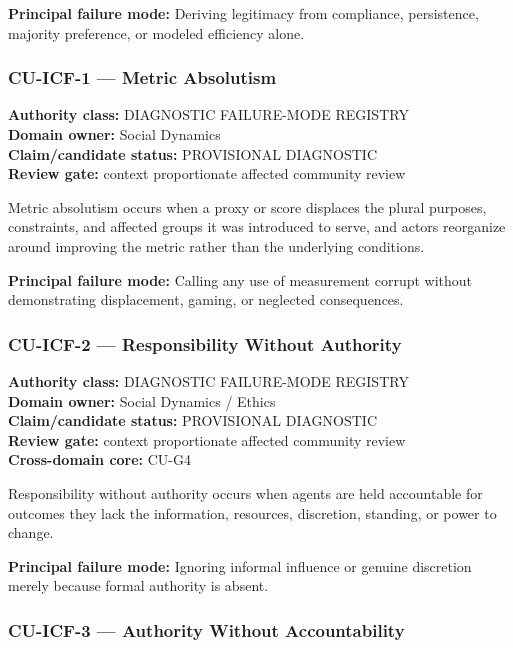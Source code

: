 \documentclass[
  11pt,
]{article}
\begin{document}
\textbf{Principal failure mode:} Deriving legitimacy from compliance,
persistence, majority preference, or modeled efficiency alone.

\subsubsection{CU-ICF-1 --- Metric
Absolutism}\label{cu-icf-1-metric-absolutism}

\textbf{Authority class:} DIAGNOSTIC FAILURE-MODE REGISTRY\\
\textbf{Domain owner:} Social Dynamics\\
\textbf{Claim/candidate status:} PROVISIONAL DIAGNOSTIC\\
\textbf{Review gate:} context proportionate affected community review

Metric absolutism occurs when a proxy or score displaces the plural
purposes, constraints, and affected groups it was introduced to serve,
and actors reorganize around improving the metric rather than the
underlying conditions.

\textbf{Principal failure mode:} Calling any use of measurement corrupt
without demonstrating displacement, gaming, or neglected consequences.

\subsubsection{CU-ICF-2 --- Responsibility Without
Authority}\label{cu-icf-2-responsibility-without-authority}

\textbf{Authority class:} DIAGNOSTIC FAILURE-MODE REGISTRY\\
\textbf{Domain owner:} Social Dynamics / Ethics\\
\textbf{Claim/candidate status:} PROVISIONAL DIAGNOSTIC\\
\textbf{Review gate:} context proportionate affected community review\\
\textbf{Cross-domain core:} CU-G4

Responsibility without authority occurs when agents are held accountable
for outcomes they lack the information, resources, discretion, standing,
or power to change.

\textbf{Principal failure mode:} Ignoring informal influence or genuine
discretion merely because formal authority is absent.

\subsubsection{CU-ICF-3 --- Authority Without
Accountability}\label{cu-icf-3-authority-without-accountability}
\end{document}
